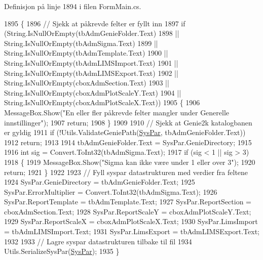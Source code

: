 Definisjon på linje 1894 i filen Form\+Main.\+cs.


\begin{DoxyCode}
1895         \{
1896             \textcolor{comment}{// Sjekk at påkrevde felter er fyllt inn}
1897             \textcolor{keywordflow}{if} (String.IsNullOrEmpty(tbAdmGenieFolder.Text) 
1898                 || String.IsNullOrEmpty(tbAdmSigma.Text)
1899                 || String.IsNullOrEmpty(tbAdmTemplate.Text)
1900                 || String.IsNullOrEmpty(tbAdmLIMSImport.Text)
1901                 || String.IsNullOrEmpty(tbAdmLIMSExport.Text)
1902                 || String.IsNullOrEmpty(cboxAdmSection.Text)
1903                 || String.IsNullOrEmpty(cboxAdmPlotScaleY.Text)
1904                 || String.IsNullOrEmpty(cboxAdmPlotScaleX.Text))
1905             \{
1906                 MessageBox.Show(\textcolor{stringliteral}{"En eller fler påkrevde felter mangler under Generelle innstillinger"});
1907                 \textcolor{keywordflow}{return};
1908             \}
1909 
1910             \textcolor{comment}{// Sjekk at Genie2k katalogbanen er gyldig}
1911             \textcolor{keywordflow}{if} (!Utils.ValidateGeniePath(\hyperlink{class_scintilab_1_1_form_main_ad41498eb151a72c77ad94c7285d0f506}{SysPar}, tbAdmGenieFolder.Text))
1912                 \textcolor{keywordflow}{return};
1913 
1914             tbAdmGenieFolder.Text = SysPar.GenieDirectory;
1915 
1916             \textcolor{keywordtype}{int} sig = Convert.ToInt32(tbAdmSigma.Text);
1917             \textcolor{keywordflow}{if} (sig < 1 || sig > 3)
1918             \{
1919                 MessageBox.Show(\textcolor{stringliteral}{"Sigma kan ikke være under 1 eller over 3"});
1920                 \textcolor{keywordflow}{return};
1921             \}
1922 
1923             \textcolor{comment}{// Fyll syspar datastrukturen med verdier fra feltene}
1924             SysPar.GenieDirectory = tbAdmGenieFolder.Text;
1925             SysPar.ErrorMultiplier = Convert.ToInt32(tbAdmSigma.Text);
1926             SysPar.ReportTemplate = tbAdmTemplate.Text;
1927             SysPar.ReportSection = cboxAdmSection.Text;
1928             SysPar.ReportScaleY = cboxAdmPlotScaleY.Text;
1929             SysPar.ReportScaleX = cboxAdmPlotScaleX.Text;
1930             SysPar.LimsImport = tbAdmLIMSImport.Text;
1931             SysPar.LimsExport = tbAdmLIMSExport.Text;
1932 
1933             \textcolor{comment}{// Lagre syspar datastrukturen tilbake til fil}
1934             Utils.SerializeSysPar(\hyperlink{class_scintilab_1_1_form_main_ad41498eb151a72c77ad94c7285d0f506}{SysPar});
1935         \}
\end{DoxyCode}
